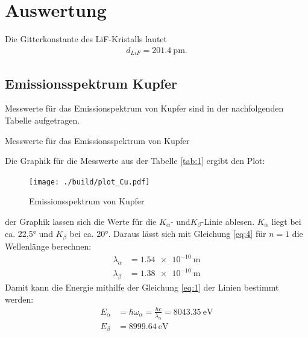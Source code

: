 
\section{Auswertung}

Die Gitterkonstante des LiF-Kristalls lautet \cite{V603}
\begin{align}
    d_{LiF}=\SI{201.4}{\pico\meter} \label{eq:5}.
\end{align}

\subsection{Emissionsspektrum Kupfer}

\justifying Messwerte für das Emissionspektrum von Kupfer sind in der nachfolgenden Tabelle 
aufgetragen.

\begin{table}[H]
    \centering
    
    \caption{Messwerte für das Emissionsspektrum von Kupfer}
    \label{tab:1}
\end{table}

Die Graphik für die Messwerte aus der Tabelle \ref{tab:1} ergibt den Plot:
\begin{figure}[H]
    \centering
    \texttt{[image: ./build/plot\_Cu.pdf]}
    \caption{Emissionsspektrum von Kupfer}
    \label{fig:3}
\end{figure}

\justifying der Graphik lassen sich die Werte für die $K_{\alpha}$- und$K_{\beta}$-Linie
ablesen. $K_{\alpha}$ liegt bei ca. 22,5° und $K_{\beta}$ bei ca. 20°.
Daraus lässt sich mit Gleichung \eqref{eq:4} für $n=1$ die Wellenlänge berechnen:
\begin{align}
    \lambda _{\alpha}&= \SI{1.54e-10}{\meter} \label{eq:6}\\
    \lambda_{\beta}&= \SI{1.38e-10}{\meter} \label{eq:7}
\end{align}
Damit kann die Energie mithilfe der Gleichung \eqref{eq:1} der Linien bestimmt werden:
\begin{subequations}
\begin{align}
    E_{\alpha}&= \hbar \omega _{\alpha} = \frac{h c}{\lambda _{\alpha}}=\SI{8043.35}{\electronvolt}  \label{eq:8a} \\
    E_{\beta}&= \SI{8999.64}{\electronvolt} \label{eq:8b}
\end{align}
\end{subequations}


